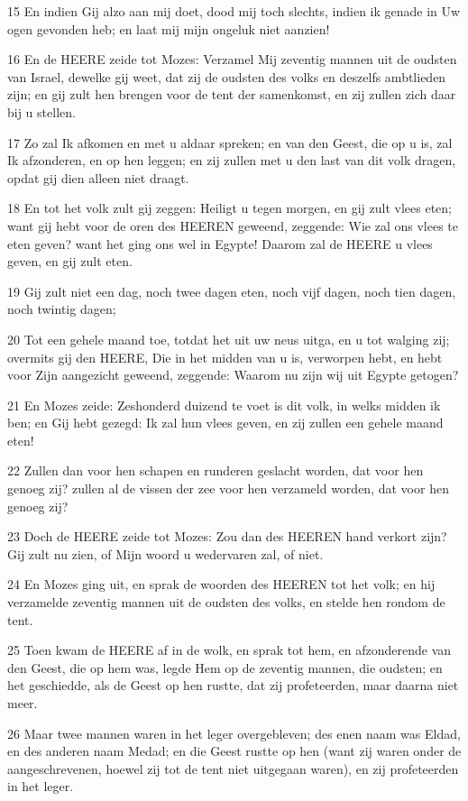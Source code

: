 \par 15 En indien Gij alzo aan mij doet, dood mij toch slechts, indien ik genade in Uw ogen gevonden heb; en laat mij mijn ongeluk niet aanzien!
\par 16 En de HEERE zeide tot Mozes: Verzamel Mij zeventig mannen uit de oudsten van Israel, dewelke gij weet, dat zij de oudsten des volks en deszelfs ambtlieden zijn; en gij zult hen brengen voor de tent der samenkomst, en zij zullen zich daar bij u stellen.
\par 17 Zo zal Ik afkomen en met u aldaar spreken; en van den Geest, die op u is, zal Ik afzonderen, en op hen leggen; en zij zullen met u den last van dit volk dragen, opdat gij dien alleen niet draagt.
\par 18 En tot het volk zult gij zeggen: Heiligt u tegen morgen, en gij zult vlees eten; want gij hebt voor de oren des HEEREN geweend, zeggende: Wie zal ons vlees te eten geven? want het ging ons wel in Egypte! Daarom zal de HEERE u vlees geven, en gij zult eten.
\par 19 Gij zult niet een dag, noch twee dagen eten, noch vijf dagen, noch tien dagen, noch twintig dagen;
\par 20 Tot een gehele maand toe, totdat het uit uw neus uitga, en u tot walging zij; overmits gij den HEERE, Die in het midden van u is, verworpen hebt, en hebt voor Zijn aangezicht geweend, zeggende: Waarom nu zijn wij uit Egypte getogen?
\par 21 En Mozes zeide: Zeshonderd duizend te voet is dit volk, in welks midden ik ben; en Gij hebt gezegd: Ik zal hun vlees geven, en zij zullen een gehele maand eten!
\par 22 Zullen dan voor hen schapen en runderen geslacht worden, dat voor hen genoeg zij? zullen al de vissen der zee voor hen verzameld worden, dat voor hen genoeg zij?
\par 23 Doch de HEERE zeide tot Mozes: Zou dan des HEEREN hand verkort zijn? Gij zult nu zien, of Mijn woord u wedervaren zal, of niet.
\par 24 En Mozes ging uit, en sprak de woorden des HEEREN tot het volk; en hij verzamelde zeventig mannen uit de oudsten des volks, en stelde hen rondom de tent.
\par 25 Toen kwam de HEERE af in de wolk, en sprak tot hem, en afzonderende van den Geest, die op hem was, legde Hem op de zeventig mannen, die oudsten; en het geschiedde, als de Geest op hen rustte, dat zij profeteerden, maar daarna niet meer.
\par 26 Maar twee mannen waren in het leger overgebleven; des enen naam was Eldad, en des anderen naam Medad; en die Geest rustte op hen (want zij waren onder de aangeschrevenen, hoewel zij tot de tent niet uitgegaan waren), en zij profeteerden in het leger.
